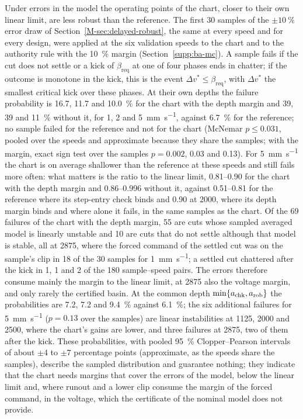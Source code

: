 Under errors in the model the operating points of the chart, closer to their own linear limit, are less robust than the reference. The first 30 samples of the $\pm\SI{10}{\percent}$ error draw of Section~\ref{M-sec:delayed-robust}, the same at every speed and for every design, were applied at the six validation speeds to the chart and to the authority rule with the \SI{10}{\percent} margin (Section~\ref{supp:ba-mc}). A sample fails if the cut does not settle or a kick of $\beta_{\mathrm{req}}$ at one of four phases ends in chatter; if the outcome is monotone in the kick, this is the event $\Delta v^*\le\beta_{\mathrm{req}}$, with $\Delta v^*$ the smallest critical kick over these phases. At their own depths the failure probability is 16.7, 11.7 and \SI{10.0}{\percent} for the chart with the depth margin and 39, 39 and \SI{11}{\percent} without it, for 1, 2 and \SI{5}{\milli\metre\per\second}, against \SI{6.7}{\percent} for the reference; no sample failed for the reference and not for the chart (McNemar $p\le0.031$, pooled over the speeds and approximate because they share the samples; with the margin, exact sign test over the samples $p=0.002$, 0.03 and 0.13). For \SI{5}{\milli\metre\per\second} the chart is on average shallower than the reference at these speeds and still fails more often: what matters is the ratio to the linear limit, 0.81--0.90 for the chart with the depth margin and 0.86--0.996 without it, against 0.51--0.81 for the reference where its step-entry check binds and 0.90 at \SI{2000}{\rpm}, where its depth margin binds and where alone it fails, in the same samples as the chart. Of the 69 failures of the chart with the depth margin, 55 are cuts whose sampled averaged model is linearly unstable and 10 are cuts that do not settle although that model is stable, all at \SI{2875}{\rpm}, where the forced command of the settled cut was on the sample's clip in 18 of the 30 samples for \SI{1}{\milli\metre\per\second}; a settled cut chattered after the kick in 1, 1 and 2 of the 180 sample--speed pairs. The errors therefore consume mainly the margin to the linear limit, at \SI{2875}{\rpm} also the voltage margin, and only rarely the certified basin. At the common depth $\min\{a_{\mathrm{chk}},a_{\mathrm{rob}}\}$ the probabilities are 7.2, 7.2 and \SI{9.4}{\percent} against \SI{6.1}{\percent}; the six additional failures for \SI{5}{\milli\metre\per\second} ($p=0.13$ over the samples) are linear instabilities at 1125, 2000 and \SI{2500}{\rpm}, where the chart's gains are lower, and three failures at \SI{2875}{\rpm}, two of them after the kick. These probabilities, with pooled \SI{95}{\percent} Clopper--Pearson intervals of about $\pm4$ to $\pm7$ percentage points (approximate, as the speeds share the samples), describe the sampled distribution and guarantee nothing; they indicate that the chart needs margins that cover the errors of the model, below the linear limit and, where runout and a lower clip consume the margin of the forced command, in the voltage, which the certificate of the nominal model does not provide.
